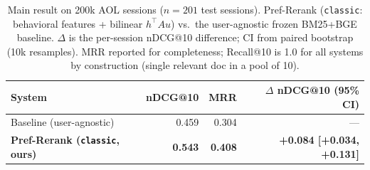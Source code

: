 \begin{table}[t]
\centering
\caption{Main result on 200k AOL sessions ($n{=}201$ test sessions). Pref-Rerank (\texttt{classic}: behavioral features + bilinear $h^\top A u$) vs.\ the user-agnostic frozen BM25+BGE baseline. $\Delta$ is the per-session nDCG@10 difference; CI from paired bootstrap (10k resamples). MRR reported for completeness; Recall@10 is 1.0 for all systems by construction (single relevant doc in a pool of 10).}
\label{tab:main}
\begin{tabular}{lrrr}
\toprule
System & nDCG@10 & MRR & $\Delta$ nDCG@10 (95\% CI) \\
\midrule
Baseline (user-agnostic) & 0.459 & 0.304 & --- \\
\textbf{Pref-Rerank (\texttt{classic}, ours)} & \textbf{0.543} & \textbf{0.408} & \textbf{+0.084 [+0.034, +0.131]} \\
\bottomrule
\end{tabular}
\end{table}
